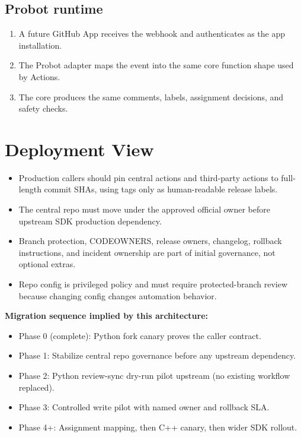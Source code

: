 \documentclass[10pt, a4paper]{article}
\begin{document}
\subsection{Probot runtime}

\begin{enumerate}
  \item A future GitHub App receives the webhook and authenticates as the app installation.
  \item The Probot adapter maps the event into the same core function shape used by Actions.
  \item The core produces the same comments, labels, assignment decisions, and safety checks.
\end{enumerate}

\section{Deployment View}

\begin{itemize}
  \item Production callers should pin central actions and third-party actions to
        full-length commit SHAs, using tags only as human-readable release labels.
  \item The central repo must move under the approved official owner before upstream
        SDK production dependency.
  \item Branch protection, CODEOWNERS, release owners, changelog, rollback instructions,
        and incident ownership are part of initial governance, not optional extras.
  \item Repo config is privileged policy and must require protected-branch review because
        changing config changes automation behavior.
\end{itemize}

\textbf{Migration sequence implied by this architecture:}
\begin{itemize}
  \item Phase 0 (complete): Python fork canary proves the caller contract.
  \item Phase 1: Stabilize central repo governance before any upstream dependency.
  \item Phase 2: Python review-sync dry-run pilot upstream (no existing workflow replaced).
  \item Phase 3: Controlled write pilot with named owner and rollback SLA.
  \item Phase 4+: Assignment mapping, then C++ canary, then wider SDK rollout.
\end{itemize}
\end{document}
